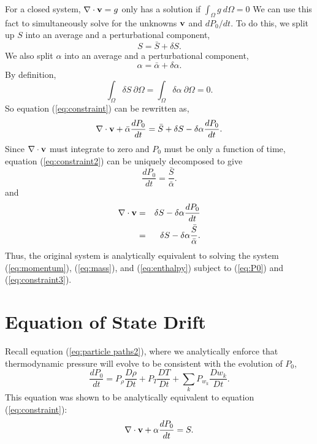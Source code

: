 \documentclass[final]{siamltex}
\def\vb {{\bf v}}
\begin{document}
For a closed system, $\nabla \cdot \vb = g$ only has a solution if $\int_\Omega g~d\Omega = 0$
We can use this fact to simultaneously solve for the unknowns
$\vb$ and $dP_0/dt$.
To do this, we split up $S$ into an average and a perturbational component,
\begin{equation}
S = \bar{S} + \delta S.
\end{equation}
We also
split $\alpha$ into an average and a perturbational component,
\begin{equation}
\alpha = \bar{\alpha} + \delta\alpha.
\end{equation}
By definition,
\begin{equation}
\int_{\Omega} \delta S ~\partial\Omega = \int_{\Omega} \delta \alpha ~\partial\Omega = 0.\label{eq:zero int}
\end{equation}
So equation (\ref{eq:constraint}) can be rewritten as,
\begin{equation}
\nabla\cdot\vb + \bar{\alpha}\frac{dP_0}{d t} 
= \bar{S} + \delta S -
\delta\alpha\frac{dP_0}{d t}.\label{eq:constraint2}
\end{equation}
Since $\nabla \cdot \vb$ must integrate to zero and $P_0$ must be only a function of time,
equation (\ref{eq:constraint2}) can be uniquely decomposed to give
\begin{equation}
\frac{dP_0}{dt} = \frac{\bar{S}}{\bar{\alpha}}.\label{eq:P0}
\end{equation}
and
\begin{eqnarray}
\nabla\cdot\vb &=& \delta S - \delta\alpha\frac{dP_0}{dt} \nonumber\\
&=& \delta S - \delta\alpha\frac{\bar{S}}{\bar{\alpha}}.\label{eq:constraint3}
\end{eqnarray}
Thus, the original system is analytically equivalent to solving the system (\ref{eq:momentum}), (\ref{eq:mass}), and (\ref{eq:enthalpy})
subject to (\ref{eq:P0}) and (\ref{eq:constraint3}).

\section{Equation of State Drift}
Recall equation (\ref{eq:particle paths2}), where we analytically enforce that
thermodynamic pressure will evolve to be consistent with the evolution of $P_0$,
\begin{equation}
\frac{dP_0}{dt} = P_\rho\frac{D\rho}{Dt} + P_T\frac{DT}{Dt} + \sum_kP_{w_k}\frac{Dw_k}{Dt}.
\end{equation}
This equation was shown to be analytically equivalent to equation (\ref{eq:constraint}):
\begin{equation}
\nabla\cdot\vb + \alpha\frac{dP_0}{dt} = S.
\end{equation}
\end{document}
